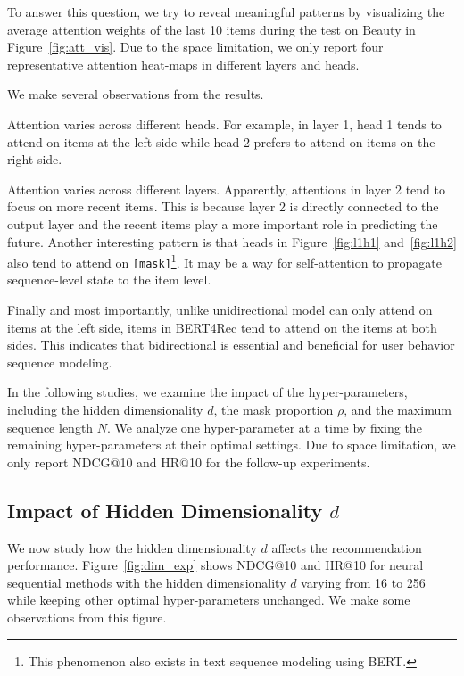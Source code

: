 To answer this question, we try to reveal meaningful patterns by visualizing the average attention weights of the last 10 items during the test on Beauty in Figure~\ref{fig:att_vis}. 
Due to the space limitation, we only report four representative attention heat-maps in different layers and heads.


We make several observations from the results.
\begin {enumerate*}[label=\bfseries\itshape\alph*\upshape)]
\item Attention varies across different heads.
For example, in layer 1, head 1 tends to attend on items at the left side while head 2 prefers to attend on items on the right side.
\item Attention varies across different layers.
Apparently, attentions in layer 2 tend to focus on more recent items.
This is because layer 2 is directly connected to the output layer and the recent items play a more important role in predicting the future.
Another interesting pattern is that heads in Figure~\ref{fig:l1h1} and~\ref{fig:l1h2} also tend to attend on \texttt{[mask]}\footnote{This phenomenon also exists in text sequence modeling using BERT.}.
It may be a way for self-attention to propagate sequence-level state to the item level.
\item Finally and most importantly, unlike unidirectional model can only attend on items at the left side, items in BERT4Rec tend to attend on the items at both sides.
This indicates that bidirectional is essential and beneficial for user behavior sequence modeling.
\end {enumerate*}



In the following studies, we examine the impact of the hyper-parameters, including the hidden dimensionality $d$, the mask proportion $\rho$, and the maximum sequence length $N$.
We analyze one hyper-parameter at a time by fixing the remaining hyper-parameters at their optimal settings. 
Due to space limitation, we only report NDCG@10 and HR@10 for the follow-up experiments. %



\subsection{Impact of Hidden Dimensionality $d$}

We now study how the hidden dimensionality $d$ affects the recommendation performance.
Figure~\ref{fig:dim_exp} shows NDCG@10 and HR@10 for neural sequential methods with the hidden dimensionality $d$ varying from 16 to 256 while keeping other optimal hyper-parameters unchanged.
We make some observations from this figure.





